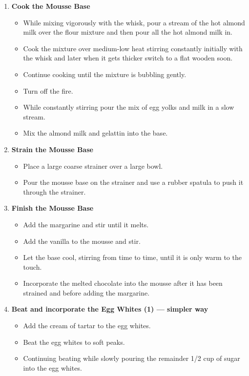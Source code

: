 \documentclass[11pt,letterpaper]{article}
\begin{document}
\begin{description}
\begin{enumerate}
	\item {\bf Cook the Mousse Base}
		\begin{itemize}
		\item While mixing vigorously with the whisk, pour a stream of the hot almond milk over the flour mixture and then pour all the hot almond milk in.
		\item Cook the mixture over medium-low heat stirring constantly initially with the whisk and later when it gets thicker switch to a flat wooden soon.
		\item Continue cooking until the mixture is bubbling gently.
		\item Turn off the fire.
		\item While constantly stirring pour the mix of egg yolks and milk in a slow stream.
		\item Mix the almond milk and gelattin into the base.
		\end{itemize}
	
	\item {\bf Strain the Mousse Base}
		\begin{itemize}
		\item Place a large coarse strainer over a large bowl.
		\item Pour the mousse base on the strainer and use a rubber spatula to push it through the strainer.
		\end{itemize}

	\item {\bf Finish the Mousse Base}
		\begin{itemize}
		\item Add the margarine and stir until it melts.
		\item Add the vanilla to the mousse and stir.
		\item Let the base cool, stirring from time to time, until it is only warm to the touch.
		\item Incorporate the melted chocolate into the mousse after it has been strained and before adding the margarine.
		\end{itemize}

	\item {\bf Beat and incorporate the Egg Whites (1) --- simpler way}
		\begin{itemize}
		\item Add the cream of tartar to the egg whites.
		\item Beat the egg whites to soft peaks.
		\item Continuing beating while slowly pouring the remainder 1/2 cup of sugar into the egg whites.
		\end{itemize}


\end{enumerate}
\end{description}
\end{document}
